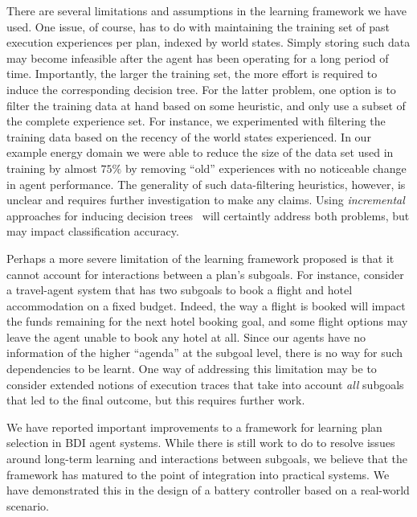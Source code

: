 There are several limitations and assumptions in the learning framework we have used.
One issue, of course, has to do with maintaining the training set of past execution experiences per plan, indexed by world states. Simply storing such data may become infeasible after the agent has been operating for a long period of time. Importantly, the larger the training set, the more effort is required to induce the corresponding decision tree. For the latter problem, one option is to filter the training data at hand based on some heuristic, and only use a subset of the complete experience set. For instance, we experimented with filtering the training data based on the recency of the world states experienced. In our example energy domain we were able to reduce the size of the data set used in training by almost $75\%$ by removing ``old'' experiences with no noticeable change in agent performance. The generality of such data-filtering heuristics, however, is unclear and requires further investigation to make any claims. Using \emph{incremental} approaches for inducing decision trees~\cite{Swere06:Fast,Utgoff97Decision} will certaintly address both problems, but may impact classification accuracy.


Perhaps a more severe limitation of the learning framework proposed is that it cannot account for interactions between a plan's subgoals. For instance, consider a travel-agent system that has two subgoals to book a flight and hotel accommodation on a fixed budget. Indeed, the way a flight is booked will impact the funds remaining for the next hotel booking goal, and  some flight options may leave the agent unable to book any hotel at all. Since our agents have no information of the higher ``agenda'' at the subgoal level, there is no way for such dependencies to be learnt. One way of addressing this limitation may be to consider extended notions of execution traces that take into account \emph{all} subgoals that led to the final outcome, but this requires further work.


We have reported important improvements to a framework for learning plan selection in BDI agent systems. While there is still work to do to resolve issues around long-term learning and interactions between subgoals, we believe that the framework has matured to the point of integration into practical systems. We have demonstrated this in the design of a battery controller based on a real-world scenario.




